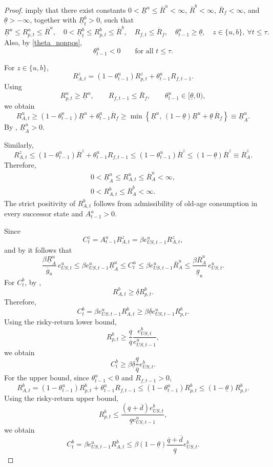 \documentclass[12pt]{article}
\theoremstyle{plain}
\begin{document}
\begin{proof}
 imply that there exist constants
$0<\underline R^u\le \overline R^u<\infty$, $\overline R^b<\infty$,
$\overline R_f<\infty$, and $\underline\theta>-\infty$, together with
$\underline R^b_t>0$, such that
\[
\underline R^u\le R_{p,t}^u\le \overline R^u,
\quad
0<\underline R^b_t\le R_{p,t}^b\le \overline R^b,
\quad
R_{f,t}\le \overline R_f,
\quad
	\theta_{t-1}^u\ge \underline{\theta},
\quad
z\in\{u,b\},\ \forall t\le\tau.
\]
Also, by \eqref{theta_nonpos},
\[
	\theta_{t-1}^u<0
\qquad\text{for all }t\le\tau.
\]

For $z\in\{u,b\}$,
\[
R_{A,t}^z=(1-\theta_{t-1}^u)R_{p,t}^z+\theta_{t-1}^u R_{f,t-1}.
\]
Using
\[
R_{p,t}^u\ge \underline R^u,
\qquad
R_{f,t-1}\le \overline R_f,
\qquad
	\theta_{t-1}^u\in[\underline\theta,0),
\]
we obtain
\[
R_{A,t}^u
\ge
(1-\theta_{t-1}^u)\underline R^u+\theta_{t-1}^u\overline R_f
\ge
\min\!\left\{
\underline R^u,\,
(1-\underline\theta)\underline R^u+\underline\theta\,\overline R_f
\right\}
\equiv
\underline R^u_A.
\]
By , $\underline R^u_A>0$.

Similarly,
\[
R_{A,t}^z
\le
(1-\theta_{t-1}^u)\overline R^z+\theta_{t-1}^u R_{f,t-1}
\le
(1-\theta_{t-1}^u)\overline R^z
\le
(1-\underline\theta)\overline R^z
\equiv
\overline R^z_A.
\]
Therefore,
\begin{align*}
    0<\underline R^u_{A}\le R_{A,t}^u\le \overline R^u_A<\infty,
    \\
    0<R_{A,t}^b\le \overline R^b_A<\infty.
\end{align*}
The strict positivity of $R^b_{A,t}$ follows from admissibility of old-age
consumption in every successor state and $A_{t-1}^u>0$.

Since
\[
C_t^z=A_{t-1}^uR_{A,t}^z=\beta e_{US,t-1}^uR_{A,t}^z,
\]
and by  it follows that
\[
\frac{\beta\underline R^u_A}{\overline g_u}\,e_{US,t}^u
\le 
\beta e_{US,t-1}^u\underline R^u_A
\le
C_t^u
\le
\beta e_{US,t-1}^u\overline R^u_A
\le
\frac{\beta\overline R^u_A}{\underline g_u}\,e_{US,t}^u.
\]
For $C^b_t$, by ,
\[
R^b_{A,t}\ge \underline\delta R^b_{p,t}.
\]
Therefore,
\[
C_t^b
=
\beta e^u_{US,t-1}R^b_{A,t}
\ge
\beta \underline\delta e^u_{US,t-1}R^b_{p,t}.
\]
Using the risky-return lower bound,
\[
R^b_{p,t}
\ge
\frac{\underline q}{\overline q}
\frac{e^b_{US,t}}{e^u_{US,t-1}},
\]
we obtain
\[
C_t^b
\ge
\beta\underline\delta
\frac{\underline q}{\overline q}
e^b_{US,t}.
\]
For the upper bound, since $\theta^u_{t-1}<0$ and $R_{f,t-1}>0$,
\[
R^b_{A,t}
=
(1-\theta^u_{t-1})R^b_{p,t}
+\theta^u_{t-1}R_{f,t-1}
\le
(1-\theta^u_{t-1})R^b_{p,t}
\le
(1-\underline\theta)R^b_{p,t}.
\]
Using the risky-return upper bound,
\[
R^b_{p,t}
\le
\frac{(\overline q+\overline d)e^b_{US,t}}
{\underline q e^u_{US,t-1}},
\]
we obtain
\[
C_t^b
=
\beta e^u_{US,t-1}R^b_{A,t}
\le
\beta(1-\underline\theta)
\frac{\overline q+\overline d}{\underline q}
e^b_{US,t}.
\]


\end{proof}
\end{document}
